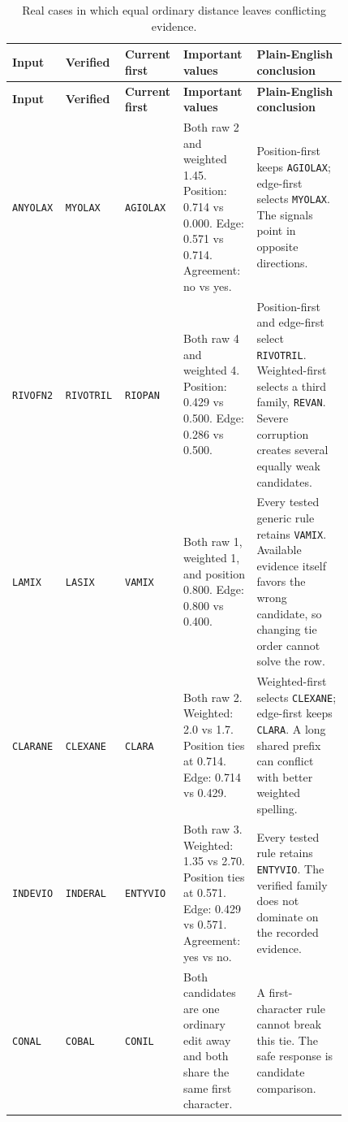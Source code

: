 \documentclass[11pt,a4paper]{article}
\newcommand{\code}[1]{\texttt{#1}}
\begin{document}
\begin{longtable}{@{}L{0.105\linewidth}L{0.115\linewidth}L{0.125\linewidth}L{0.215\linewidth}L{0.26\linewidth}@{}}
\caption{Real cases in which equal ordinary distance leaves conflicting evidence.}\label{tab:real-ties}\\
\toprule
\textbf{Input} & \textbf{Verified} & \textbf{Current first} & \textbf{Important values} & \textbf{Plain-English conclusion} \\
\midrule
\endfirsthead
\toprule
\textbf{Input} & \textbf{Verified} & \textbf{Current first} & \textbf{Important values} & \textbf{Plain-English conclusion} \\
\midrule
\endhead
\code{ANYOLAX} & \code{MYOLAX} & \code{AGIOLAX} & Both raw 2 and weighted 1.45. Position: 0.714 vs 0.000. Edge: 0.571 vs 0.714. Agreement: no vs yes. & Position-first keeps \code{AGIOLAX}; edge-first selects \code{MYOLAX}. The signals point in opposite directions. \\
\code{RIVOFN2} & \code{RIVOTRIL} & \code{RIOPAN} & Both raw 4 and weighted 4. Position: 0.429 vs 0.500. Edge: 0.286 vs 0.500. & Position-first and edge-first select \code{RIVOTRIL}. Weighted-first selects a third family, \code{REVAN}. Severe corruption creates several equally weak candidates. \\
\code{LAMIX} & \code{LASIX} & \code{VAMIX} & Both raw 1, weighted 1, and position 0.800. Edge: 0.800 vs 0.400. & Every tested generic rule retains \code{VAMIX}. Available evidence itself favors the wrong candidate, so changing tie order cannot solve the row. \\
\code{CLARANE} & \code{CLEXANE} & \code{CLARA} & Both raw 2. Weighted: 2.0 vs 1.7. Position ties at 0.714. Edge: 0.714 vs 0.429. & Weighted-first selects \code{CLEXANE}; edge-first keeps \code{CLARA}. A long shared prefix can conflict with better weighted spelling. \\
\code{INDEVIO} & \code{INDERAL} & \code{ENTYVIO} & Both raw 3. Weighted: 1.35 vs 2.70. Position ties at 0.571. Edge: 0.429 vs 0.571. Agreement: yes vs no. & Every tested rule retains \code{ENTYVIO}. The verified family does not dominate on the recorded evidence. \\
\code{CONAL} & \code{COBAL} & \code{CONIL} & Both candidates are one ordinary edit away and both share the same first character. & A first-character rule cannot break this tie. The safe response is candidate comparison. \\
\bottomrule
\end{longtable}
\end{document}
